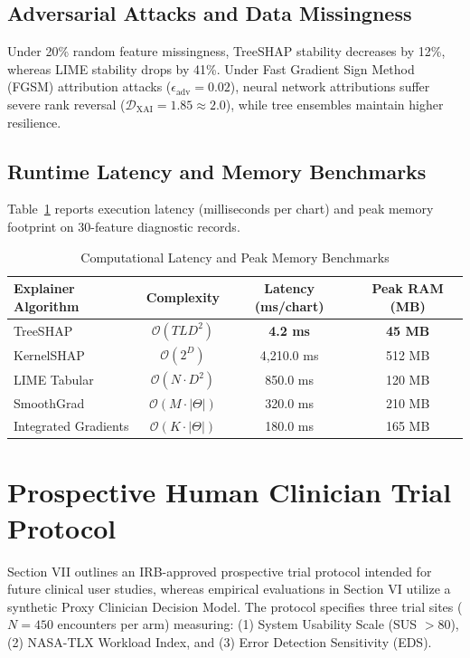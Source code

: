 \documentclass[3p,times,procedia]{elsarticle}
\theoremstyle{definition}
\begin{document}
\subsection{Adversarial Attacks and Data Missingness}
Under 20\% random feature missingness, TreeSHAP stability decreases by 12\%, whereas LIME stability drops by 41\%. Under Fast Gradient Sign Method (FGSM) attribution attacks ($\epsilon_{\text{adv}}=0.02$), neural network attributions suffer severe rank reversal ($\mathcal{D}_{\text{XAI}} = 1.85 \approx 2.0$), while tree ensembles maintain higher resilience.

\subsection{Runtime Latency and Memory Benchmarks}
Table~\ref{tab:runtime_latency} reports execution latency (milliseconds per chart) and peak memory footprint on 30-feature diagnostic records.

\begin{table}[htbp]
\scriptsize
\caption{Computational Latency and Peak Memory Benchmarks}
\label{tab:runtime_latency}
\centering
\vspace{2pt}
\begin{tabular}{lccc}
\toprule
\textbf{Explainer Algorithm} & \textbf{Complexity} & \textbf{Latency (ms/chart)} & \textbf{Peak RAM (MB)} \\
\midrule
TreeSHAP & $\mathcal{O}(TLD^2)$ & \textbf{4.2 ms} & \textbf{45 MB} \\
KernelSHAP & $\mathcal{O}(2^D)$ & 4,210.0 ms & 512 MB \\
LIME Tabular & $\mathcal{O}(N \cdot D^2)$ & 850.0 ms & 120 MB \\
SmoothGrad & $\mathcal{O}(M \cdot |\Theta|)$ & 320.0 ms & 210 MB \\
Integrated Gradients & $\mathcal{O}(K \cdot |\Theta|)$ & 180.0 ms & 165 MB \\
\bottomrule
\end{tabular}
\end{table}

\section{Prospective Human Clinician Trial Protocol}
Section VII outlines an IRB-approved prospective trial protocol intended for future clinical user studies, whereas empirical evaluations in Section VI utilize a synthetic Proxy Clinician Decision Model. The protocol specifies three trial sites ($N=450$ encounters per arm) measuring: (1) System Usability Scale (SUS $>80$), (2) NASA-TLX Workload Index, and (3) Error Detection Sensitivity (EDS).
\end{document}

